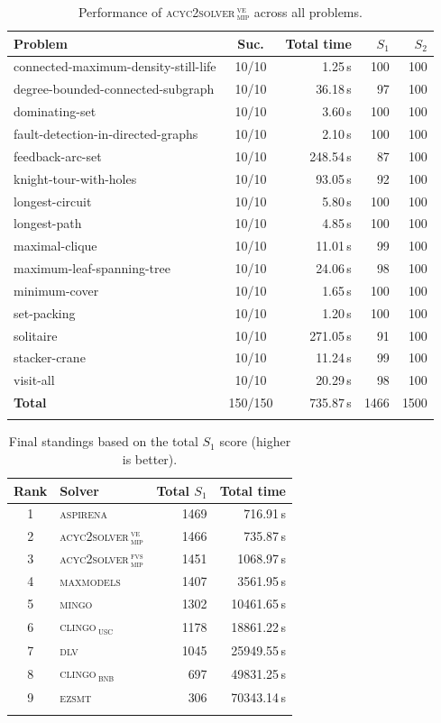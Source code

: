 \begin{table}[htbp]
\centering
\caption{Performance of \textsc{acyc2solver\,$_{\text{mip}}^{\text{ve}}$} across all problems.}
\label{tab:performance-acyc2solver_mip_fvs_smodels_gurobi}
\begin{tabular}{lcrrr}
\toprule
Problem & Suc. & Total time & $S_1$ & $S_2$ \\
\midrule
connected-maximum-density-still-life & 10/10 & 1.25\,s & 100 & 100 \\
degree-bounded-connected-subgraph & 10/10 & 36.18\,s & 97 & 100 \\
dominating-set & 10/10 & 3.60\,s & 100 & 100 \\
fault-detection-in-directed-graphs & 10/10 & 2.10\,s & 100 & 100 \\
feedback-arc-set & 10/10 & 248.54\,s & 87 & 100 \\
knight-tour-with-holes & 10/10 & 93.05\,s & 92 & 100 \\
longest-circuit & 10/10 & 5.80\,s & 100 & 100 \\
longest-path & 10/10 & 4.85\,s & 100 & 100 \\
maximal-clique & 10/10 & 11.01\,s & 99 & 100 \\
maximum-leaf-spanning-tree & 10/10 & 24.06\,s & 98 & 100 \\
minimum-cover & 10/10 & 1.65\,s & 100 & 100 \\
set-packing & 10/10 & 1.20\,s & 100 & 100 \\
solitaire & 10/10 & 271.05\,s & 91 & 100 \\
stacker-crane & 10/10 & 11.24\,s & 99 & 100 \\
visit-all & 10/10 & 20.29\,s & 98 & 100 \\
\midrule
\textbf{Total} & 150/150 & 735.87\,s & 1466 & 1500 \\
\botrule
\end{tabular}
\end{table}

\begin{table}[htbp]
\centering
\caption{Final standings based on the total $S_1$ score (higher is better).}
\label{tab:final-standings-s1}
\begin{tabular}{clrr}
\toprule
Rank & Solver & Total $S_1$ & Total time \\
\midrule
1 & \textsc{aspirena} & 1469 & 716.91\,s \\
2 & \textsc{acyc2solver\,$_{\text{mip}}^{\text{ve}}$} & 1466 & 735.87\,s \\
3 & \textsc{acyc2solver\,$_{\text{mip}}^{\text{fvs}}$} & 1451 & 1068.97\,s \\
4 & \textsc{maxmodels} & 1407 & 3561.95\,s \\
5 & \textsc{mingo} & 1302 & 10461.65\,s \\
6 & \textsc{clingo\,\textsubscript{usc}} & 1178 & 18861.22\,s \\
7 & \textsc{dlv} & 1045 & 25949.55\,s \\
8 & \textsc{clingo\,\textsubscript{bnb}} & 697 & 49831.25\,s \\
9 & \textsc{ezsmt} & 306 & 70343.14\,s \\
\botrule
\end{tabular}
\end{table}

